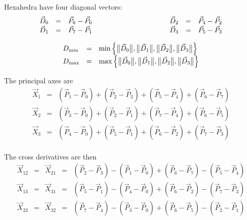 Hexahedra have four diagonal vectors:
\begin{equation*}
\begin{array}{lcl}
\vec D_0 &=& \vec P_6 - \vec P_0\\
\vec D_1 &=& \vec P_7 - \vec P_1
\end{array}\rule{10em}{0pt}
\begin{array}{lcl}
\vec D_2 &=& \vec P_4 - \vec P_2\\
\vec D_3 &=& \vec P_5 - \vec P_3
\end{array}
\end{equation*}

\begin{equation*}
\begin{array}{lcl}
  D_{\min} &=& \min\left\{\big\lVert{\vec D_0}\big\rVert,\big\lVert{\vec D_1}\big\rVert,\big\lVert{\vec D_2}\big\rVert,\big\lVert{\vec D_3}\big\rVert \right\}\\
  D_{\max} &=& \max\left\{\big\lVert{\vec D_0}\big\rVert,\big\lVert{\vec D_1}\big\rVert,\big\lVert{\vec D_2}\big\rVert,\big\lVert{\vec D_3}\big\rVert \right\}
\end{array}
\end{equation*}

The principal axes are
\begin{equation*}
\begin{array}{lcl}
  \vec X_1 &=&
    \left(\vec P_1-\vec P_0\right) + \left(\vec P_2-\vec P_3\right) +
    \left(\vec P_5-\vec P_4\right) + \left(\vec P_6-\vec P_7\right)\\
  \vec X_2 &=&
    \left(\vec P_3-\vec P_0\right) + \left(\vec P_2-\vec P_1\right) +
    \left(\vec P_7-\vec P_4\right) + \left(\vec P_6-\vec P_5\right)\\
  \vec X_3 &=&
    \left(\vec P_4-\vec P_0\right) + \left(\vec P_5-\vec P_1\right) +
    \left(\vec P_6-\vec P_2\right) + \left(\vec P_7-\vec P_3\right)\\
\end{array}
\end{equation*}

The cross derivatives are then
\begin{equation*}
\begin{array}{lclcl}
  \vec X_{12} &=& \vec X_{21} &=&
    \left(\vec P_2-\vec P_3\right) - \left(\vec P_1-\vec P_0\right) +
    \left(\vec P_6-\vec P_7\right) - \left(\vec P_5-\vec P_4\right) \\
  \vec X_{13} &=& \vec X_{31} &=&
    \left(\vec P_5-\vec P_1\right) - \left(\vec P_4-\vec P_0\right) +
    \left(\vec P_6-\vec P_2\right) - \left(\vec P_7-\vec P_3\right) \\
  \vec X_{23} &=& \vec X_{32} &=&
    \left(\vec P_7-\vec P_4\right) - \left(\vec P_3-\vec P_0\right) +
    \left(\vec P_6-\vec P_5\right) - \left(\vec P_2-\vec P_1\right) \\
\end{array}
\end{equation*}

